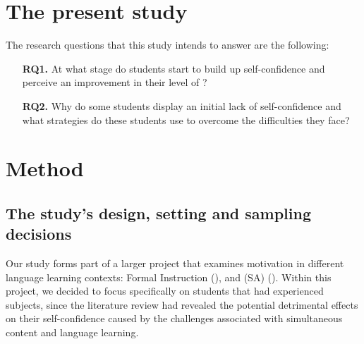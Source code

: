\documentclass[output=paper]{langsci/langscibook}
\begin{document}
\section{The present study}

The research questions that this study intends to answer are the following:


\begin{itemize}
 \item [\textbf{RQ1.}] At what stage do  students start to build up  self-confi\-dence and perceive an improvement in their level of ?
\item [\textbf{RQ2.}] Why do some  students display an initial lack of self-confidence and what strategies do these students use to overcome the difficulties they face?
\end{itemize}






\section{Method} 

\subsection{The study’s design, setting and sampling decisions}

Our study forms part of a larger project that examines motivation in different language learning contexts: Formal Instruction (),  and  (SA) (\cite{Moratinos-JohnstonForthcoming}). Within this project, we decided to focus specifically on students that had experienced  subjects, since the literature review had revealed the potential detrimental effects on their  self-confidence caused by the challenges associated with simultaneous content and language learning. 
\end{document}
